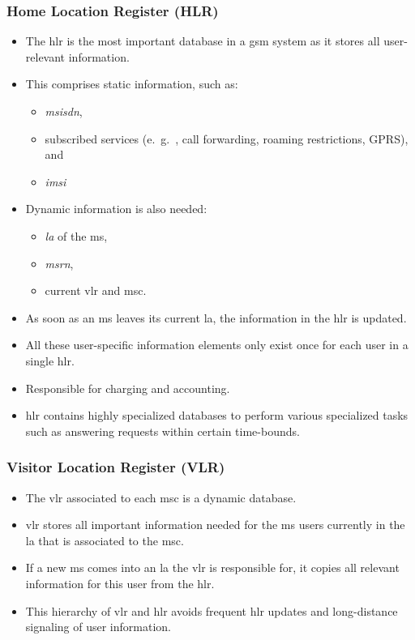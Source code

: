 \subsubsection[HLR]{Home Location Register (HLR)}
\begin{itemize}
	\item The \gls{hlr} is the most important database in a \gls{gsm} system as it stores all user-relevant information.
	\item This comprises static information, such as:
	\begin{itemize}
		\item \textit{\gls{msisdn}},
		\item subscribed services (e.\ g.\ , call forwarding, roaming restrictions, GPRS), and
		\item \textit{\gls{imsi}}
	\end{itemize}
\item  Dynamic information is also needed:
	\begin{itemize}
	\item \textit{\gls{la}} of the \gls{ms},
	\item \textit{\gls{msrn}},
	\item current \gls{vlr} and \gls{msc}.
\end{itemize}

\item As soon as an \gls{ms} leaves its current \gls{la}, the information in the \gls{hlr} is updated.
\item All these user-specific information elements only exist once for each user in a single \gls{hlr}.
\item Responsible for charging and accounting.
\item \gls{hlr} contains highly specialized databases to perform various specialized tasks such as answering requests within certain time-bounds.
\end{itemize}
 
\subsubsection[VLR]{Visitor Location Register (VLR)}
\begin{itemize}
	\item The \gls{vlr} associated to each \gls{msc} is a dynamic database. 
	\item \gls{vlr} stores all important information needed for the \gls{ms} users currently in the \gls{la} that is associated to the \gls{msc}. 
	\item If a new \gls{ms} comes into an \gls{la} the \gls{vlr} is responsible for, it copies all relevant information for this user from the \gls{hlr}. 
	\item This hierarchy of \gls{vlr} and \gls{hlr} avoids frequent \gls{hlr} updates and long-distance signaling of user information.
\end{itemize}


